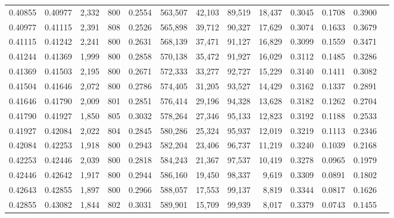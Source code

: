 \begin{tabular}{rrrrrrrrrrrrr}
0.40855 & 0.40977 &  2,332 & 800 &                                     0.2554 & 563,507 &  42,103 &  89,519 &  18,437 & 0.3045 & 0.1708 & 0.3900 \\
0.40977 & 0.41115 &  2,391 & 808 &                                     0.2526 & 565,898 &  39,712 &  90,327 &  17,629 & 0.3074 & 0.1633 & 0.3679 \\
0.41115 & 0.41242 &  2,241 & 800 &                                     0.2631 & 568,139 &  37,471 &  91,127 &  16,829 & 0.3099 & 0.1559 & 0.3471 \\
0.41244 & 0.41369 &  1,999 & 800 &                                     0.2858 & 570,138 &  35,472 &  91,927 &  16,029 & 0.3112 & 0.1485 & 0.3286 \\
0.41369 & 0.41503 &  2,195 & 800 &                                     0.2671 & 572,333 &  33,277 &  92,727 &  15,229 & 0.3140 & 0.1411 & 0.3082 \\
0.41504 & 0.41646 &  2,072 & 800 &                                     0.2786 & 574,405 &  31,205 &  93,527 &  14,429 & 0.3162 & 0.1337 & 0.2891 \\
0.41646 & 0.41790 &  2,009 & 801 &                                     0.2851 & 576,414 &  29,196 &  94,328 &  13,628 & 0.3182 & 0.1262 & 0.2704 \\
0.41790 & 0.41927 &  1,850 & 805 &                                     0.3032 & 578,264 &  27,346 &  95,133 &  12,823 & 0.3192 & 0.1188 & 0.2533 \\
0.41927 & 0.42084 &  2,022 & 804 &                                     0.2845 & 580,286 &  25,324 &  95,937 &  12,019 & 0.3219 & 0.1113 & 0.2346 \\
0.42084 & 0.42253 &  1,918 & 800 &                                     0.2943 & 582,204 &  23,406 &  96,737 &  11,219 & 0.3240 & 0.1039 & 0.2168 \\
0.42253 & 0.42446 &  2,039 & 800 &                                     0.2818 & 584,243 &  21,367 &  97,537 &  10,419 & 0.3278 & 0.0965 & 0.1979 \\
0.42446 & 0.42642 &  1,917 & 800 &                                     0.2944 & 586,160 &  19,450 &  98,337 &   9,619 & 0.3309 & 0.0891 & 0.1802 \\
0.42643 & 0.42855 &  1,897 & 800 &                                     0.2966 & 588,057 &  17,553 &  99,137 &   8,819 & 0.3344 & 0.0817 & 0.1626 \\
0.42855 & 0.43082 &  1,844 & 802 &                                     0.3031 & 589,901 &  15,709 &  99,939 &   8,017 & 0.3379 & 0.0743 & 0.1455 \\

\end{tabular}
